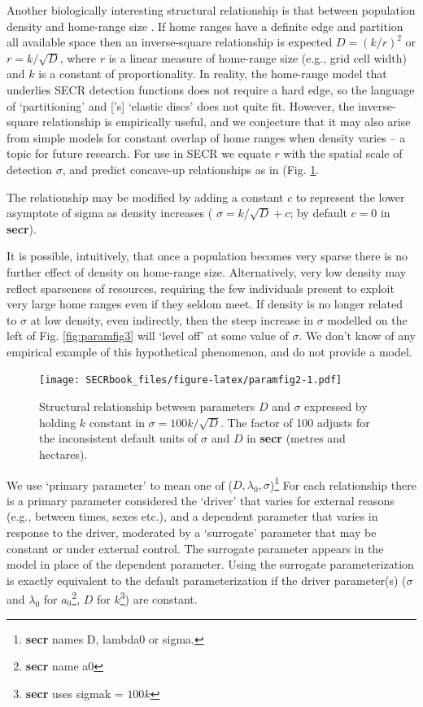 \documentclass[
]{book}
\begin{document}
Another biologically interesting structural relationship is that between population density and home-range size \citep{edjq16}. If home ranges have a definite edge and partition all available space then an inverse-square relationship is expected \(D = (k / r)^2\) or \(r = k / \sqrt D\), where \(r\) is a linear measure of home-range size (e.g., grid cell width) and \(k\) is a constant of proportionality. In reality, the home-range model that underlies SECR detection functions does not require a hard edge, so the language of `partitioning' and \citet{Huxley1934}{[}'s{]} `elastic discs' does not quite fit. However, the inverse-square relationship is empirically useful, and we conjecture that it may also arise from simple models for constant overlap of home ranges when density varies -- a topic for future research. For use in SECR we equate \(r\) with the spatial scale of detection \(\sigma\), and predict concave-up relationships as in (Fig. \ref{fig:paramfig2}.

The relationship may be modified by adding a constant \(c\) to represent the lower asymptote of sigma as density increases ( \(\sigma = k / \sqrt D + c\); by default \(c = 0\) in \textbf{secr}).

It is possible, intuitively, that once a population becomes very sparse there is no further effect of density on home-range size. Alternatively, very low density may reflect sparseness of resources, requiring the few individuals present to exploit very large home ranges even if they seldom meet. If density is no longer related to \(\sigma\) at low density, even indirectly, then the steep increase in \(\sigma\) modelled on the left of Fig. \ref{fig:paramfig3} will `level off' at some value of \(\sigma\). We don't know of any empirical example of this hypothetical phenomenon, and do not provide a model.



\begin{figure}
\centering
\texttt{[image: SECRbook\_files/figure-latex/paramfig2-1.pdf]}
\caption{\label{fig:paramfig2}Structural relationship between parameters \(D\) and \(\sigma\) expressed by holding \(k\) constant in \(\sigma = 100 k / \sqrt D\). The factor of 100 adjusts for the inconsistent default units of \(\sigma\) and \(D\) in \textbf{secr} (metres and hectares).}
\end{figure}

We use `primary parameter' to mean one of (\(D, \lambda_0, \sigma\))\footnote{\textbf{secr} names D, lambda0 or sigma.} For each relationship there is a primary parameter considered the `driver' that varies for external reasons (e.g., between times, sexes etc.), and a dependent parameter that varies in response to the driver, moderated by a `surrogate' parameter that may be constant or under external control. The surrogate parameter appears in the model in place of the dependent parameter. Using the surrogate parameterization is exactly equivalent to the default parameterization if the driver parameter(s) (\(\sigma\) and \(\lambda_0\) for \(a_0\)\footnote{\textbf{secr} name a0}, \(D\) for \(k\)\footnote{\textbf{secr} uses sigmak = \(100k\)}) are constant.
\end{document}
